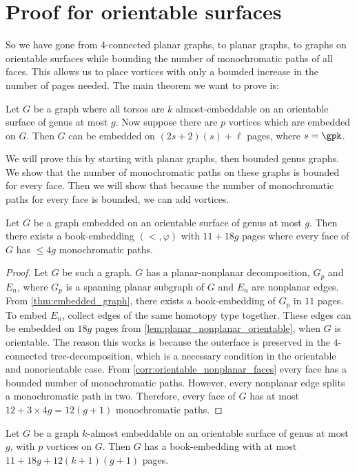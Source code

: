 \section{Proof for orientable surfaces}
So we have gone from 4-connected planar graphs, to planar graphs, to graphs on orientable surfaces while bounding the number of monochromatic paths of all faces. This allows us to place vortices with only a bounded increase in the number of pages needed.
The main theorem we want to prove is:
\begin{theorem}\label{thm:orientablevortices}
	Let $G$ be a graph where all torsos are $k$ almost-embeddable on an orientable surface of genus at most $g$.  Now suppose there are $p$ vortices which are embedded on $G$. Then $G$ can be embedded on $(2s + 2)(s) + \ell$ pages, where $s = \gpk$. 
\end{theorem}

We will prove this by starting with planar graphs, then bounded genus graphs. We show that the number of monochromatic paths on these graphs is bounded for every face. Then we will show that because the number of monochromatic paths for every face is bounded, we can add vortices.

\begin{lemma}\label{lem:orientablesurfaces_monochromatic_edges}
	Let $G$ be a graph embedded on an orientable surface of genus at most $g$. Then there exists a book-embedding $(<, \varphi)$ with $11 + 18g$ pages where every face of $G$ has $ \leq 4g$ monochromatic paths.
\end{lemma}
\begin{proof}
	Let $G$ be such a graph. $G$ has a planar-nonplanar decomposition, $G_p$ and $E_n$, where $G_p$ is a spanning planar subgraph of $G$ and $E_n$ are nonplanar edges. From \cref{thm:embedded_graph}, there exists a book-embedding of $G_p$ in $11$ pages. To embed $E_n$, collect edges of the same homotopy type together. These edges can be embedded on $18g$ pages from \cref{lem:planar_nonplanar_orientable}, when $G$ is orientable. The reason this works is because the outerface is preserved in the $4$-connected tree-decomposition, which is a necessary condition in the orientable and nonorientable case.
	From \cref{corr:orientable_nonplanar_faces} every face has a bounded number of monochromatic paths. However, every nonplanar edge splits a monochromatic path in two. Therefore, every face of $G$ has at most $12 + 3 \times 4g = 12(g + 1)$ monochromatic paths.
\end{proof}
\begin{lemma}\label{lem:orientablesurfaces_almostembeddable}
	Let $G$ be a graph $k$-almost embeddable on an orientable surface of genus at most $g$, with $p$ vortices on $G$. Then $G$ has a book-embedding with at most $11 + 18g + 12(k + 1)(g + 1)$ pages.
\end{lemma}

